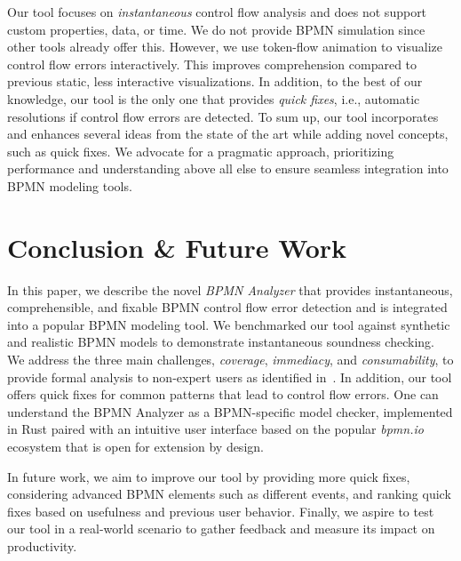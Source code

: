 \documentclass[
onecolumn, %
]{ceurart}
\begin{document}
Our tool focuses on \textit{instantaneous} control flow analysis and does not support custom properties, data, or time.
We do not provide BPMN simulation since other tools already offer this.
However, we use token-flow animation to visualize control flow errors interactively.
This improves comprehension compared to previous static, less interactive visualizations.
In addition, to the best of our knowledge, our tool is the only one that provides \textit{quick fixes}, i.e., automatic resolutions if control flow errors are detected.
To sum up, our tool incorporates and enhances several ideas from the state of the art while adding novel concepts, such as quick fixes.
We advocate for a pragmatic approach, prioritizing performance and understanding above all else to ensure seamless integration into BPMN modeling tools.

\section{Conclusion \& Future Work} \label{sec:conclusion}

In this paper, we describe the novel \textit{BPMN Analyzer} that provides instantaneous, comprehensible, and fixable BPMN control flow error detection and is integrated into a popular BPMN modeling tool.
We benchmarked our tool against synthetic and realistic BPMN models to demonstrate instantaneous soundness checking.
We address the three main challenges, \textit{coverage}, \textit{immediacy}, and \textit{consumability}, to provide formal analysis to non-expert users as identified in~\cite{fahlandAnalysisDemandInstantaneous2011}.
In addition, our tool offers quick fixes for common patterns that lead to control flow errors.
One can understand the BPMN Analyzer as a BPMN-specific model checker, implemented in Rust paired with an intuitive user interface based on the popular \textit{bpmn.io} ecosystem that is open for extension by design.

In future work, we aim to improve our tool by providing more quick fixes, considering advanced BPMN elements such as different events, and ranking quick fixes based on usefulness and previous user behavior.
Finally, we aspire to test our tool in a real-world scenario to gather feedback and measure its impact on productivity.


\end{document}
